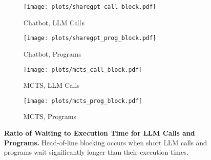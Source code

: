 \begin{figure}[t]
\centering
\begin{subfigure}[b]{0.49\columnwidth}
    \texttt{[image: plots/sharegpt\_call\_block.pdf]}
    \caption{Chatbot, LLM Calls}
    \label{fig:sharegpt_call_block}
\end{subfigure}
\hfill
\begin{subfigure}[b]{0.49\columnwidth}
    \texttt{[image: plots/sharegpt\_prog\_block.pdf]}
    \caption{Chatbot, Programs}
    \label{fig:sharegpt_prog_block}
\end{subfigure}
\hfill
\vspace{2mm}
\begin{subfigure}[b]{0.49\columnwidth}
    \texttt{[image: plots/mcts\_call\_block.pdf]}
    \caption{MCTS, LLM Calls}
    \label{fig:MCTS_call_block}
\end{subfigure}
\hfill
\begin{subfigure}[b]{0.49\columnwidth}
    \texttt{[image: plots/mcts\_prog\_block.pdf]}
    \caption{MCTS, Programs}
    \label{fig:MCTS_prog_block}
\end{subfigure}
\caption{\small \textbf{Ratio of Waiting to Execution Time for LLM Calls and Programs.} Head-of-line blocking occurs when short LLM calls and programs wait significantly longer than their execution times.}
\label{fig:hol}
\vspace{-5mm}
\end{figure}
